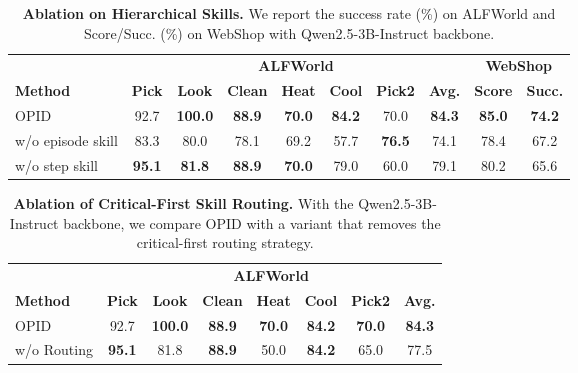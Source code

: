 \documentclass{llmxive}
\providecommand{\arraystretch}{1.08}
\begin{document}
\begin{table}[ht!]
\centering
\vspace{0.05in}
\label{tab:ablation_hierarchical_skills}
\small
\setlength{\tabcolsep}{5.5pt}
\renewcommand{\arraystretch}{1.08}
\begin{tabular}{lccccccccc}
\toprule
& \multicolumn{7}{c}{\textbf{ALFWorld}}
& \multicolumn{2}{c}{\textbf{WebShop}} \\
\cmidrule(lr){2-8} \cmidrule(lr){9-10}
\textbf{Method}
& \textbf{Pick} & \textbf{Look} & \textbf{Clean} & \textbf{Heat} & \textbf{Cool} & \textbf{Pick2} & \textbf{Avg.}
& \textbf{Score} & \textbf{Succ.} \\
\midrule
\rowcolor{gray!10}
OPID
    & 92.7 & \textbf{100.0} & \textbf{88.9} & \textbf{70.0} & \textbf{84.2} & 70.0 & \textbf{84.3}
    & \textbf{85.0} & \textbf{74.2}
    \\
\midrule
\;\;\;w/o episode skill
    & 83.3 & 80.0 & 78.1 & 69.2 & 57.7 & \textbf{76.5} & 74.1
    & 78.4 & 67.2
    \\
\;\;\;w/o step skill
    & \textbf{95.1} & \textbf{81.8} & \textbf{88.9} & \textbf{70.0} & 79.0 & 60.0 & 79.1
    & 80.2 & 65.6
    \\
\bottomrule
\end{tabular}
\caption{
    \textbf{Ablation on Hierarchical Skills.}
    We report the success rate (\%) on ALFWorld and Score/Succ. (\%) on WebShop with Qwen2.5-3B-Instruct backbone.
}
\end{table}
\begin{table}[ht!]
\centering
\vspace{0.05in}
\label{tab:ablation_critical_first}
\small
\renewcommand{\arraystretch}{1.08}
\begin{tabular}{lccccccc}
\toprule
& \multicolumn{7}{c}{\textbf{ALFWorld}} \\
\cmidrule(lr){2-8}
\textbf{Method}
& \textbf{Pick} & \textbf{Look} & \textbf{Clean} & \textbf{Heat} & \textbf{Cool} & \textbf{Pick2} & \textbf{Avg.} \\
\midrule
\rowcolor{gray!10}
OPID
    & 92.7 & \textbf{100.0} & \textbf{88.9} & \textbf{70.0} & \textbf{84.2} & \textbf{70.0} & \textbf{84.3}
    \\
\;\;\;w/o Routing
    & \textbf{95.1} & 81.8 & \textbf{88.9} & 50.0 & \textbf{84.2} & 65.0 & 77.5
    \\
\bottomrule
\end{tabular}
\caption{
    \textbf{Ablation of Critical-First Skill Routing.}
    With the Qwen2.5-3B-Instruct backbone, we compare OPID with a variant that removes the critical-first routing strategy.
}
\end{table}
\end{document}
